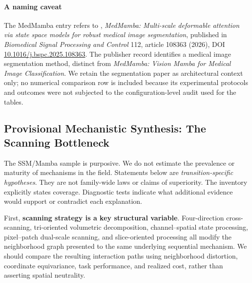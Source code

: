 \documentclass[5p,times,authoryear]{elsarticle}
\begin{document}
\begin{table}[!t]
\begin{tabularx}{\textwidth}
\bottomrule
\end{tabularx}
\caption{Representative Mamba-based segmentation architectures. Model variants, dataset-specific measurements, and numerical sources are listed per row. HD is not quietly converted to HD95. No assumption of common distance units. No pooling/ordering results in a leaderboard. NR, NV, and the provenance marker are defined in Table~\ref{tab:transformer_medseg}.}
\label{tab:mamba_seg}
\end{table}

\paragraph{A naming caveat}
The MedMamba entry refers to \citet{wang2026medmamba}, \emph{MedMamba: Multi-scale deformable attention via state space models for robust medical image segmentation}, published in \emph{Biomedical Signal Processing and Control} 112, article 108363 (2026), DOI \href{https://doi.org/10.1016/j.bspc.2025.108363}{10.1016/j.bspc.2025.108363}. The publisher record identifies a medical image segmentation method, distinct from \emph{MedMamba: Vision Mamba for Medical Image Classification}. We retain the segmentation paper as architectural context only; no numerical comparison row is included because its experimental protocols and outcomes were not subjected to the configuration-level audit used for the tables.

\subsection{Provisional Mechanistic Synthesis: The Scanning Bottleneck}


The SSM/Mamba sample is purposive. We do not estimate the prevalence or maturity of mechanisms in the field. Statements below are \emph{transition-specific hypotheses}. They are not family-wide laws or claims of superiority. The inventory explicitly states coverage. Diagnostic tests indicate what additional evidence would support or contradict each explanation.

First, \textbf{scanning strategy is a key structural variable}. Four-direction cross-scanning, tri-oriented volumetric decomposition, channel--spatial state processing, pixel--patch dual-scale scanning, and slice-oriented processing all modify the neighborhood graph presented to the same underlying sequential mechanism. We should compare the resulting interaction paths using neighborhood distortion, coordinate equivariance, task performance, and realized cost, rather than asserting spatial neutrality.
\end{document}
